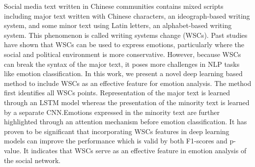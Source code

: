 Social media text written in Chinese communities contains mixed scripts including major text written with Chinese characters, an ideograph-based writing system, and some minor text using Latin letters, an alphabet-based writing system. This phenomenon is called writing systems change (WSCs). Past studies have shown that WSCs can be used to express emotions, particularly where the social and political environment is more conservative. However, because WSCs can break the syntax of the major text, it poses more challenges in NLP tasks like emotion classification. In this work, we present a novel deep learning based method to include WSCs as an effective feature for emotion analysis. The method first identifies all WSCs points. Representation of the major text is learned through an LSTM model whereas the presentation of the minority text is learned by a separate CNN.Emotions expressed in the minority text are further highlighted through an attention mechanism before emotion classification. It has proven to be significant that incorporating WSCs features in deep learning models can improve the performance which is valid by both F1-scores and p-value. It indicates that WSCs serve as an effective feature in emotion analysis of the social network.
